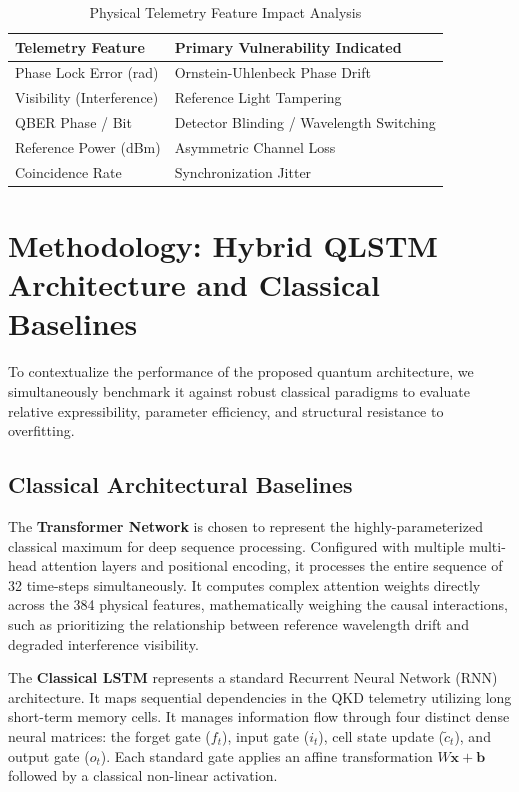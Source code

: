 \documentclass[10pt, journal, letterpaper, twocolumn]{IEEEtran}
\begin{document}
\begin{table}[htbp]
\centering
\caption{Physical Telemetry Feature Impact Analysis}
\label{tab:telemetry_features}
\begin{tabular}{@{}p{4.5cm}p{4cm}@{}}
\toprule
\textbf{Telemetry Feature} & \textbf{Primary Vulnerability Indicated} \\ \midrule
Phase Lock Error (rad) & Ornstein-Uhlenbeck Phase Drift \\
Visibility (Interference) & Reference Light Tampering \\
QBER Phase / Bit & Detector Blinding / Wavelength Switching \\
Reference Power (dBm) & Asymmetric Channel Loss \\
Coincidence Rate & Synchronization Jitter \\
\bottomrule
\end{tabular}
\end{table}


\section{Methodology: Hybrid QLSTM Architecture and Classical Baselines}
To contextualize the performance of the proposed quantum architecture, we simultaneously benchmark it against robust classical paradigms to evaluate relative expressibility, parameter efficiency, and structural resistance to overfitting.

\subsection{Classical Architectural Baselines}
The \textbf{Transformer Network} is chosen to represent the highly-parameterized classical maximum for deep sequence processing. Configured with multiple multi-head attention layers and positional encoding, it processes the entire sequence of 32 time-steps simultaneously. It computes complex attention weights directly across the 384 physical features, mathematically weighing the causal interactions, such as prioritizing the relationship between reference wavelength drift and degraded interference visibility.

The \textbf{Classical LSTM} represents a standard Recurrent Neural Network (RNN) architecture. It maps sequential dependencies in the QKD telemetry utilizing long short-term memory cells. It manages information flow through four distinct dense neural matrices: the forget gate ($f_t$), input gate ($i_t$), cell state update ($\tilde{c}_t$), and output gate ($o_t$). Each standard gate applies an affine transformation $W \mathbf{x} + \mathbf{b}$ followed by a classical non-linear activation.
\end{document}
